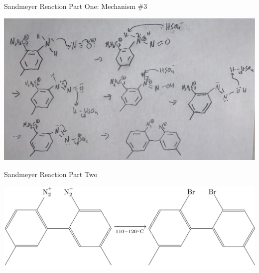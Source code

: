 \documentclass[notes]{beamer}
\begin{document}
\begin{frame}{Sandmeyer Reaction Part One: Mechanism \#3}

\begin{center}
    \includegraphics[scale=.35]{sandmeyer_part_one_three.JPG}
\end{center}

\note{\begin{itemize}
    \item 
\end{itemize}}
    
\end{frame}

\begin{frame}{Sandmeyer Reaction Part Two}
    \begin{center}
        \includegraphics[scale=.2]{sandmeyer_part_two_overall.JPG}
    \end{center}
    
\end{frame}
\end{document}
